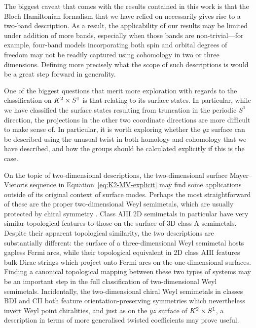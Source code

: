 The biggest caveat that comes with the results contained in this work is that the Bloch Hamiltonian formalism that we have relied on necessarily gives rise to a two-band description. As a result, the applicability of our results may be limited under addition of more bands, especially when those bands are non-trivial---for example, four-band models incorporating both spin and orbital degrees of freedom may not be readily captured using cohomology in two or three dimensions. Defining more precisely what the scope of such descriptions is would be a great step forward in generality.

One of the biggest questions that merit more exploration with regards to the classification on $K^2\times S^1$ is that relating to its surface states. In particular, while we have classified the surface states resulting from truncation in the periodic $S^1$ direction, the projections in the other two coordinate directions are more difficult to make sense of. In particular, it is worth exploring whether the $yz$ surface can be described using the unusual twist in both homology and cohomology that we have described, and how the groups should be calculated explicitly if this is the case.

On the topic of two-dimensional descriptions, the two-dimensional surface Mayer--Vietoris sequence in Equation~\eqref{eq:K2-MV-explicit} may find some applications outside of its original context of surface modes. Perhaps the most straightforward of these are the proper two-dimensional Weyl semimetals, which are usually protected by chiral symmetry \cite{Abdulla_chiral-WSM}. Class AIII 2D semimetals in particular have very similar topological features to those on the surface of 3D class A semimetals. Despite their apparent topological similarity, the two descriptions are substantially different: the surface of a three-dimensional Weyl semimetal hosts gapless Fermi arcs, while their topological equivalent in 2D class AIII features bulk Dirac strings which project onto Fermi arcs on the one-dimensional surfaces. Finding a canonical topological mapping between these two types of systems may be an important step in the full classification of two-dimensional Weyl semimetals. Incidentally, the two-dimensional chiral Weyl semimetals in classes BDI and CII both feature orientation-preserving symmetries which nevertheless invert Weyl point chiralities, and just as on the $yz$ surface of $K^2\times S^1$, a description in terms of more generalised twisted coefficients may prove useful.

